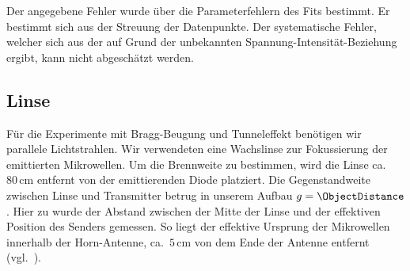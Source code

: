 \documentclass[a4paper,10pt,twocolumn]{article}
\begin{document}
    Der angegebene Fehler wurde über die Parameterfehlern des Fits bestimmt.
    Er bestimmt sich aus der Streuung der Datenpunkte.
    Der systematische Fehler, welcher sich aus der auf Grund der unbekannten Spannung-Intensität-Beziehung ergibt, kann
    nicht abgeschätzt werden.
    
    \subsection{Linse}

    

    Für die Experimente mit Bragg-Beugung und Tunneleffekt benötigen wir parallele Lichtstrahlen. 
    Wir verwendeten eine Wachslinse zur Fokussierung der emittierten Mikrowellen. 
    Um die Brennweite zu bestimmen, wird die Linse ca.\ $80\, \mathrm{cm}$ entfernt von der emittierenden Diode platziert. 
    Die Gegenstandweite zwischen Linse und Transmitter betrug in unserem Aufbau $g = \ObjectDistance$.
    Hier zu wurde der Abstand zwischen der Mitte der Linse und der effektiven Position des Senders gemessen.
    So liegt der effektive Ursprung der Mikrowellen innerhalb der Horn-Antenne, ca.\ $5\,\mathrm{cm}$ von dem
    Ende der Antenne entfernt (vgl.\ \cite{pasco}).
    
\end{document}
